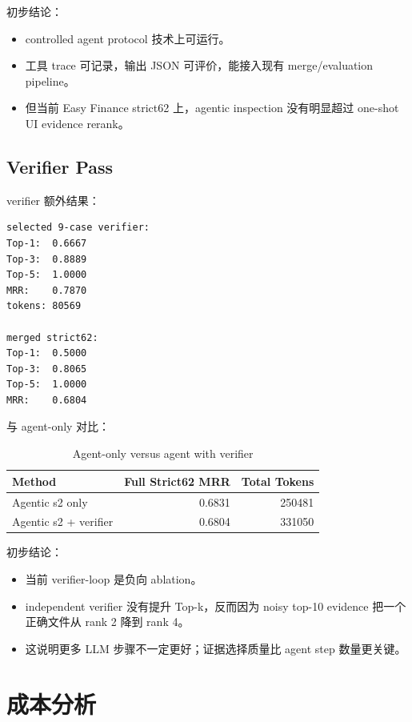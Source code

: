 \documentclass[12pt,a4paper]{ctexart}
\begin{document}
初步结论：

\begin{itemize}
  \item controlled agent protocol 技术上可运行。
  \item 工具 trace 可记录，输出 JSON 可评价，能接入现有 merge/evaluation pipeline。
  \item 但当前 Easy Finance strict62 上，agentic inspection 没有明显超过 one-shot UI evidence rerank。
\end{itemize}

\subsection{Verifier Pass}

verifier 额外结果：

\begin{lstlisting}
selected 9-case verifier:
Top-1:  0.6667
Top-3:  0.8889
Top-5:  1.0000
MRR:    0.7870
tokens: 80569

merged strict62:
Top-1:  0.5000
Top-3:  0.8065
Top-5:  1.0000
MRR:    0.6804
\end{lstlisting}

与 agent-only 对比：

\begin{table}[H]
\centering
\caption{Agent-only versus agent with verifier}
\label{tab:agent-verifier}
\begin{tabularx}{\textwidth}{@{}Yrr@{}}
\toprule
Method & Full Strict62 MRR & Total Tokens \\
\midrule
Agentic s2 only & 0.6831 & 250481 \\
Agentic s2 + verifier & 0.6804 & 331050 \\
\bottomrule
\end{tabularx}
\end{table}

初步结论：

\begin{itemize}
  \item 当前 verifier-loop 是负向 ablation。
  \item independent verifier 没有提升 Top-k，反而因为 noisy top-10 evidence 把一个正确文件从 rank 2 降到 rank 4。
  \item 这说明更多 LLM 步骤不一定更好；证据选择质量比 agent step 数量更关键。
\end{itemize}

\section{成本分析}
\end{document}
